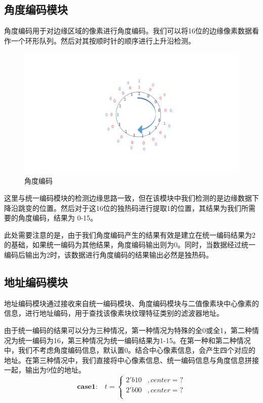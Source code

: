 \documentclass[12pt, a4paper, oneside]{ctexbook}
\begin{document}
	\subsection{角度编码模块}
	角度编码用于对边缘区域的像素进行角度编码。我们可以将16位的边缘像素数据看作一个环形队列。然后对其按顺时针的顺序进行上升沿检测。
		\begin{figure}[h]	
		\centering
		\includegraphics[scale=0.5]{pic/angle.pdf}
		\caption{角度编码}
		\end{figure}
	\par 这里与统一编码模块的检测边缘思路一致，但在该模块中我们检测的是边缘数据下降沿跳变的位置。然后对于这16位的独热码进行提取1的位置，其结果为我们所需要的角度编码，结果为 0-15。\par 此处需要注意的是，由于我们角度编码产生的结果有效是建立在统一编码结果为2的基础，如果统一编码为其他结果，角度编码输出则为0。同时，当数据经过统一编码后输出为2时，该数据进行角度编码的结果输出必然是独热码。
	\subsection{地址编码模块}
	地址编码模块通过接收来自统一编码模块、角度编码模块与二值像素块中心像素的信息，进行地址编码，用于查找该像素块纹理特征类别的滤波器地址。\par 由于统一编码的结果可以分为三种情况，第一种情况为特殊的全0或全1，第二种情况为统一编码为16，第三种情况为统一编码结果为1-15。在第一种和第二种情况中，我们不考虑角度编码信息，默认置0。结合中心像素信息，会产生四个对应的地址。在第三种情况中，我们直接将中心像素信息、统一编码信息与角度信息拼接一起，输出为9位的地址。
	$$
	\textbf{case1:} \quad t=
		\begin{cases}
			2'b10 &,center = ? \\
			2'b00 &,center = ? \\
		\end{cases}
	$$
	
\end{document}
